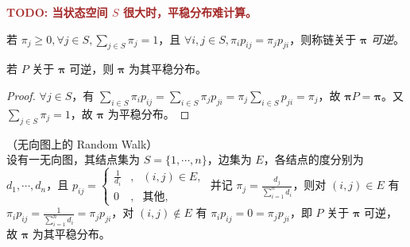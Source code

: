 \documentclass[../main.tex]{subfiles}
\begin{document}
\textbf{\textcolor{brown}{TODO: 当状态空间 $S$ 很大时，平稳分布难计算。}}

\begin{definition}\label{def:7.5.1}
    若 $\pi_j\geq0,\forall j\in S,\sum_{j\in S}\pi_j=1$，且 $\forall i,j\in S,\pi_ip_{ij}=\pi_jp_{ji}$，则称链关于 $\boldsymbol\pi$ \emph{可逆}。
\end{definition}

\begin{theorem}\label{thm:7.5.1}
    若 $P$ 关于 $\boldsymbol\pi$ 可逆，则 $\boldsymbol\pi$ 为其平稳分布。
\end{theorem}

\begin{proof}
    $\forall j\in S$，有 $\sum_{i\in S}\pi_ip_{ij}=\sum_{i\in S}\pi_jp_{ji}=\pi_j\sum_{i\in S}p_{ji}=\pi_j$，故 $\boldsymbol\pi P=\boldsymbol\pi$。又 $\sum_{j\in S}\pi_j=1$，故 $\boldsymbol\pi$ 为平稳分布。
\end{proof}

\begin{example}
    （无向图上的 Random Walk）\\
    设有一无向图，其结点集为 $S=\{1,\cdots,n\}$，边集为 $E$，各结点的度分别为 $d_1,\cdots,d_n$，且 $p_{ij}=
        \left\{\begin{aligned}
            \frac1{d_i} & , & (i,j)\in E,  \\
            0           & , & \text{其他},
        \end{aligned}\right.$
    并记 $\pi_j=\frac{d_j}{\sum_{i=1}^nd_i}$，则对 $(i,j)\in E$ 有 $\pi_ip_{ij}=\frac1{\sum_{i=1}^nd_i}=\pi_jp_{ji}$，对 $(i,j)\notin E$ 有 $\pi_ip_{ij}=0=\pi_jp_{ji}$，即 $P$ 关于 $\boldsymbol\pi$ 可逆，故 $\boldsymbol\pi$ 为其平稳分布。
\end{example}
\end{document}
